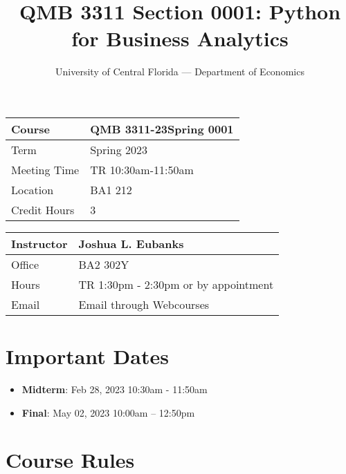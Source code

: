 \documentclass[11pt]{paper}
\begin{document}
\title{QMB 3311 Section 0001: Python for Business Analytics}
\author{University of Central Florida --- Department of Economics}

\maketitle
\hrulefill

\begin{table}[!htb]
    \begin{minipage}{.5\linewidth}
      \centering
 \begin{tabular}{| l | l |}\hline
 Course & QMB 3311-23Spring 0001 \\\hline
 Term & Spring 2023 \\\hline
 Meeting Time & TR 10:30am-11:50am\\\hline
 Location & BA1 212\\\hline
 Credit Hours & 3 \\\hline
\end{tabular}
    \end{minipage}%
    \begin{minipage}{.5\linewidth}
      \centering
\begin{tabular}{| l | l |}\hline
 Instructor & Joshua L. Eubanks \\\hline
 Office & BA2 302Y \\\hline
 Hours & TR 1:30pm - 2:30pm or by appointment \\\hline
 Email & Email through Webcourses \\\hline
\end{tabular}
    \end{minipage} 
\end{table}




\section*{Important Dates}

\begin{itemize}
  \item \textbf{Midterm}: Feb 28, 2023 10:30am - 11:50am
  \item \textbf{Final}: May 02, 2023 10:00am – 12:50pm
\end{itemize}


\tableofcontents

\newpage

\section{Course Rules}
\end{document}
